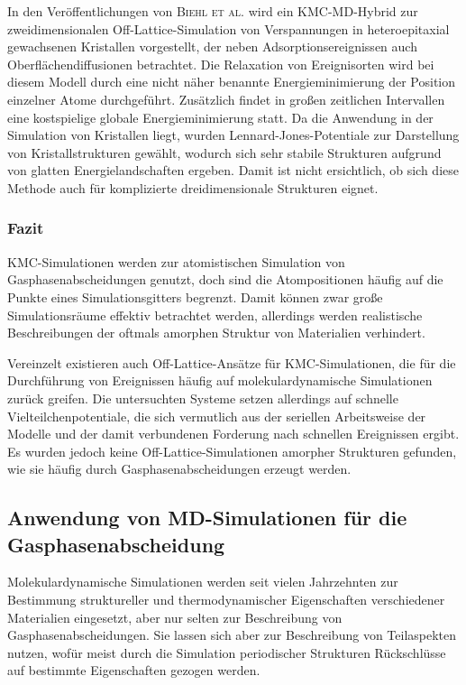 In den Veröffentlichungen von \textsc{Biehl et al.}\cite{biehl_off-lattice_2005} wird ein KMC-MD-Hybrid zur zweidimensionalen Off-Lattice-Simulation von Verspannungen in heteroepitaxial gewachsenen Kristallen vorgestellt, der neben Adsorptionsereignissen auch Oberflächendiffusionen betrachtet.
Die Relaxation von Ereignisorten wird bei diesem Modell durch eine nicht näher benannte Energieminimierung der Position einzelner Atome durchgeführt.
Zusätzlich findet in großen zeitlichen Intervallen eine kostspielige globale Energieminimierung statt.
Da die Anwendung in der Simulation von Kristallen liegt, wurden Lennard-Jones-Potentiale zur Darstellung von Kristallstrukturen gewählt, wodurch sich sehr stabile Strukturen aufgrund von glatten Energielandschaften ergeben.
Damit ist nicht ersichtlich, ob sich diese Methode auch für komplizierte dreidimensionale Strukturen eignet.

\subsubsection{Fazit}

KMC-Simulationen werden zur atomistischen Simulation von Gasphasenabscheidungen genutzt, doch sind die Atompositionen häufig auf die Punkte eines Simulationsgitters begrenzt.
Damit können zwar große Simulationsräume effektiv betrachtet werden, allerdings werden realistische Beschreibungen der oftmals amorphen Struktur von Materialien verhindert.

Vereinzelt existieren auch Off-Lattice-Ansätze für KMC-Simulationen, die für die Durchführung von Ereignissen häufig auf molekulardynamische Simulationen zurück greifen.
Die untersuchten Systeme setzen allerdings auf schnelle Vielteilchenpotentiale, die sich vermutlich aus der seriellen Arbeitsweise der Modelle und der damit verbundenen Forderung nach schnellen Ereignissen ergibt.
Es wurden jedoch keine Off-Lattice-Simulationen amorpher Strukturen gefunden, wie sie häufig durch Gasphasenabscheidungen erzeugt werden.

\subsection{Anwendung von MD-Simulationen für die Gasphasenabscheidung}

Molekulardynamische Simulationen werden seit vielen Jahrzehnten zur Bestimmung struktureller und thermodynamischer Eigenschaften verschiedener Materialien eingesetzt, aber nur selten zur Beschreibung von Gasphasenabscheidungen.
Sie lassen sich aber zur Beschreibung von Teilaspekten nutzen, wofür meist durch die Simulation periodischer Strukturen Rückschlüsse auf bestimmte Eigenschaften gezogen werden.

